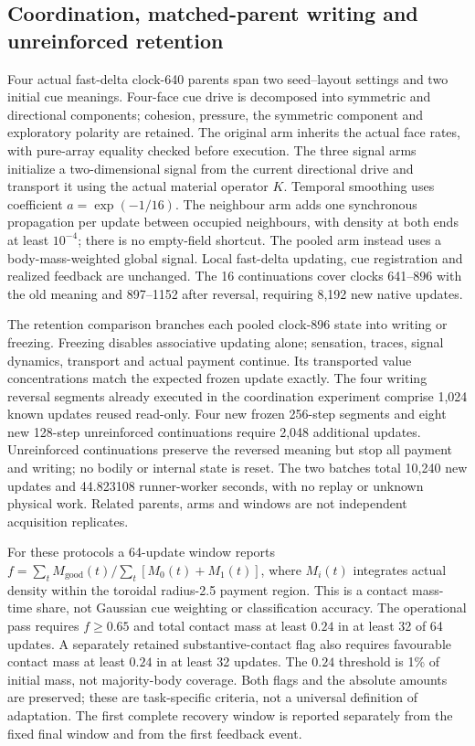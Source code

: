\subsection*{Coordination, matched-parent writing and unreinforced retention}

Four actual fast-delta clock-640 parents span two seed--layout settings and two initial cue meanings. Four-face cue drive is decomposed into symmetric and directional components; cohesion, pressure, the symmetric component and exploratory polarity are retained. The original arm inherits the actual face rates, with pure-array equality checked before execution. The three signal arms initialize a two-dimensional signal from the current directional drive and transport it using the actual material operator $K$. Temporal smoothing uses coefficient $a=\exp(-1/16)$. The neighbour arm adds one synchronous propagation per update between occupied neighbours, with density at both ends at least $10^{-4}$; there is no empty-field shortcut. The pooled arm instead uses a body-mass-weighted global signal. Local fast-delta updating, cue registration and realized feedback are unchanged. The 16 continuations cover clocks 641--896 with the old meaning and 897--1152 after reversal, requiring 8,192 new native updates.

The retention comparison branches each pooled clock-896 state into writing or freezing. Freezing disables associative updating alone; sensation, traces, signal dynamics, transport and actual payment continue. Its transported value concentrations match the expected frozen update exactly. The four writing reversal segments already executed in the coordination experiment comprise 1,024 known updates reused read-only. Four new frozen 256-step segments and eight new 128-step unreinforced continuations require 2,048 additional updates. Unreinforced continuations preserve the reversed meaning but stop all payment and writing; no bodily or internal state is reset. The two batches total 10,240 new updates and 44.823108 runner-worker seconds, with no replay or unknown physical work. Related parents, arms and windows are not independent acquisition replicates.

For these protocols a 64-update window reports $f=\sum_t M_{\mathrm{good}}(t)/\sum_t[M_0(t)+M_1(t)]$, where $M_i(t)$ integrates actual density within the toroidal radius-2.5 payment region. This is a contact mass-time share, not Gaussian cue weighting or classification accuracy. The operational pass requires $f\geq0.65$ and total contact mass at least $0.24$ in at least 32 of 64 updates. A separately retained substantive-contact flag also requires favourable contact mass at least $0.24$ in at least 32 updates. The $0.24$ threshold is 1\% of initial mass, not majority-body coverage. Both flags and the absolute amounts are preserved; these are task-specific criteria, not a universal definition of adaptation. The first complete recovery window is reported separately from the fixed final window and from the first feedback event.

